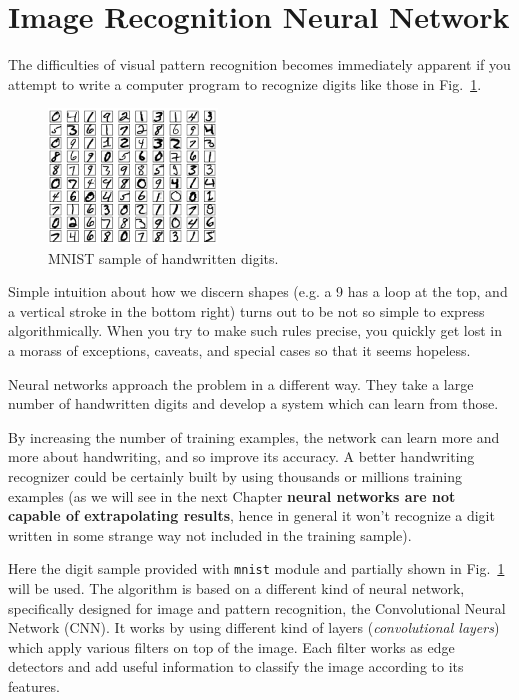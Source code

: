 \section{Image Recognition Neural Network}
\label{neural-net-to-recognize-handwritten-digits}

The difficulties of visual pattern recognition becomes immediately apparent if you attempt to write a computer program to recognize digits like those in Fig.~\ref{fig:mnist}.

\begin{figure}[!htb]
\centering
\includegraphics[width=0.4\textwidth]{figures/mnist_100_digits}
\caption{MNIST sample of handwritten digits.}
\label{fig:mnist}
\end{figure}

Simple intuition about how we discern shapes (e.g. a 9 has a loop at the top, and a vertical stroke in the bottom right) turns out to be not so simple to express algorithmically. When you try to make such rules precise, you quickly get lost in a morass of exceptions, caveats, and special cases so that it seems hopeless.

Neural networks approach the problem in a different way. They take a large number of handwritten digits and develop a system which can learn from those.

By increasing the number of training examples, the network can learn more and more about handwriting, and so improve its accuracy. A better handwriting recognizer could be certainly built by using thousands or millions training examples (as we will see in the next Chapter \textbf{neural networks are not capable of extrapolating results}, hence in general it won't recognize a digit written in some strange way not included in the training sample).

Here the digit sample provided with \texttt{mnist} module and partially shown in Fig.~\ref{fig:mnist} will be used. 
The algorithm is based on a different kind of neural network, specifically designed for image and pattern recognition, the Convolutional Neural Network (CNN). It works by using different kind of layers (\emph{convolutional layers}) which apply various filters on top of the image. Each filter works as edge detectors and add useful information to classify the image according to its features.

